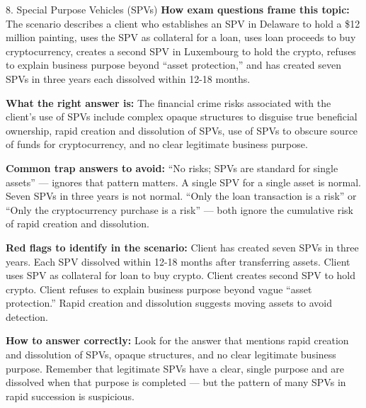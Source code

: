 \documentclass[11pt,a4paper]{beamer}
\begin{document}
	\begin{frame}{8. Special Purpose Vehicles (SPVs)}
		\tiny
		\noindent\textbf{How exam questions frame this topic:} The scenario describes a client who establishes an SPV in Delaware to hold a \$12 million painting, uses the SPV as collateral for a loan, uses loan proceeds to buy cryptocurrency, creates a second SPV in Luxembourg to hold the crypto, refuses to explain business purpose beyond “asset protection,” and has created seven SPVs in three years each dissolved within 12-18 months.
		
		\vspace{0.1cm}
		\noindent\textbf{What the right answer is:} The financial crime risks associated with the client's use of SPVs include complex opaque structures to disguise true beneficial ownership, rapid creation and dissolution of SPVs, use of SPVs to obscure source of funds for cryptocurrency, and no clear legitimate business purpose.
		
		\vspace{0.1cm}
		\noindent\textbf{Common trap answers to avoid:} “No risks; SPVs are standard for single assets” — ignores that pattern matters. A single SPV for a single asset is normal. Seven SPVs in three years is not normal. “Only the loan transaction is a risk” or “Only the cryptocurrency purchase is a risk” — both ignore the cumulative risk of rapid creation and dissolution.
		
		\vspace{0.1cm}
		\noindent\textbf{Red flags to identify in the scenario:} Client has created seven SPVs in three years. Each SPV dissolved within 12-18 months after transferring assets. Client uses SPV as collateral for loan to buy crypto. Client creates second SPV to hold crypto. Client refuses to explain business purpose beyond vague “asset protection.” Rapid creation and dissolution suggests moving assets to avoid detection.
		
		\vspace{0.1cm}
		\noindent\textbf{How to answer correctly:} Look for the answer that mentions rapid creation and dissolution of SPVs, opaque structures, and no clear legitimate business purpose. Remember that legitimate SPVs have a clear, single purpose and are dissolved when that purpose is completed — but the pattern of many SPVs in rapid succession is suspicious.
	\end{frame}
	
\end{document}
